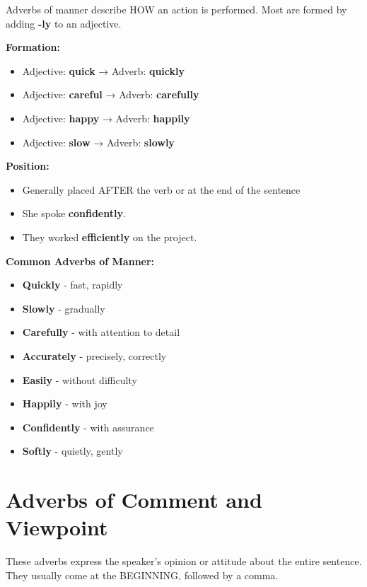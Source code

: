 Adverbs of manner describe HOW an action is performed. Most are formed by adding \textbf{-ly} to an adjective.

\begin{grammarbox}[title=Adverbs of Manner]
\textbf{Formation:}
\begin{itemize}
    \item Adjective: \textbf{quick} → Adverb: \textbf{quickly}
    \item Adjective: \textbf{careful} → Adverb: \textbf{carefully}
    \item Adjective: \textbf{happy} → Adverb: \textbf{happily}
    \item Adjective: \textbf{slow} → Adverb: \textbf{slowly}
\end{itemize}

\textbf{Position:}
\begin{itemize}
    \item Generally placed AFTER the verb or at the end of the sentence
    \item She spoke \textbf{confidently}. 
    \item They worked \textbf{efficiently} on the project. 
\end{itemize}

\textbf{Common Adverbs of Manner:}
\begin{itemize}
    \item \textbf{Quickly} - fast, rapidly
    \item \textbf{Slowly} - gradually
    \item \textbf{Carefully} - with attention to detail
    \item \textbf{Accurately} - precisely, correctly
    \item \textbf{Easily} - without difficulty
    \item \textbf{Happily} - with joy
    \item \textbf{Confidently} - with assurance
    \item \textbf{Softly} - quietly, gently
\end{itemize}
\end{grammarbox}

\section{Adverbs of Comment and Viewpoint}

These adverbs express the speaker's opinion or attitude about the entire sentence. They usually come at the BEGINNING, followed by a comma.

